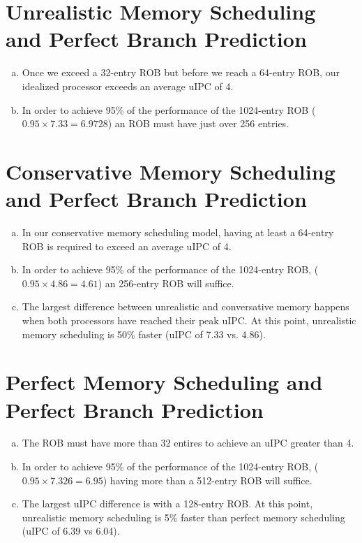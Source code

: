 \documentclass[12pt,twoside]{article}
\begin{document}
\banner

\section{Unrealistic Memory Scheduling and Perfect Branch Prediction}
\begin{enumerate}[a)]
\item Once we exceed a 32-entry ROB but before we reach a 64-entry ROB, our
  idealized processor exceeds an average uIPC of 4.
\item In order to achieve 95\% of the performance of the 1024-entry ROB
  ($0.95\times 7.33=6.9728$) an ROB must have just over 256 entries.
\end{enumerate}

\section{Conservative Memory Scheduling and Perfect Branch Prediction}
\begin{enumerate}[a)]
\item In our conservative memory scheduling model, having at least a 64-entry
  ROB is required to exceed an average uIPC of 4.
\item In order to achieve 95\% of the performance of the 1024-entry ROB,
  ($0.95\times 4.86=4.61$) an 256-entry ROB will suffice.
\item The largest difference between unrealistic and conversative memory
  happens when both processors have reached their peak uIPC.  At this point,
  unrealistic memory scheduling is 50\% faster (uIPC of 7.33 vs. 4.86).
\end{enumerate}

\section{Perfect Memory Scheduling and Perfect Branch Prediction}

\begin{enumerate}[a)]
\item The ROB must have more than 32 entires to achieve an uIPC greater than 4.
\item In order to achieve 95\% of the performance of the 1024-entry ROB,
  ($0.95\times 7.326=6.95$) having more than a 512-entry ROB will suffice.
\item The largest uIPC difference is with a 128-entry ROB.  At this point,
  unrealistic memory scheduling is 5\% faster than perfect memory
  scheduling (uIPC of 6.39 vs 6.04).
\end{enumerate}
\end{document}
